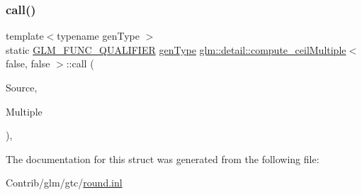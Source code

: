 \subsubsection{\texorpdfstring{call()}{call()}}
{\footnotesize\ttfamily template$<$typename gen\+Type $>$ \\
static \mbox{\hyperlink{setup_8hpp_a33fdea6f91c5f834105f7415e2a64407}{G\+L\+M\+\_\+\+F\+U\+N\+C\+\_\+\+Q\+U\+A\+L\+I\+F\+I\+ER}} \mbox{\hyperlink{structglm_1_1detail_1_1gen_type}{gen\+Type}} \mbox{\hyperlink{structglm_1_1detail_1_1compute__ceil_multiple}{glm\+::detail\+::compute\+\_\+ceil\+Multiple}}$<$ false, false $>$\+::call (\begin{DoxyParamCaption}\item[{\mbox{\hyperlink{structglm_1_1detail_1_1gen_type}{gen\+Type}}}]{Source,  }\item[{\mbox{\hyperlink{structglm_1_1detail_1_1gen_type}{gen\+Type}}}]{Multiple }\end{DoxyParamCaption})\hspace{0.3cm}{\ttfamily [inline]}, {\ttfamily [static]}}



The documentation for this struct was generated from the following file\+:\begin{DoxyCompactItemize}
\item 
Contrib/glm/gtc/\mbox{\hyperlink{round_8inl}{round.\+inl}}\end{DoxyCompactItemize}
